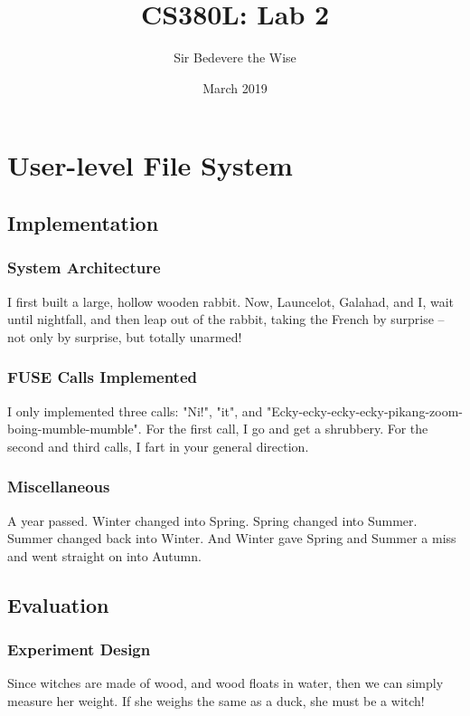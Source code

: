 \documentclass{article}
\title{CS380L: Lab 2}
\author{Sir Bedevere the Wise}
\date{March 2019}
\begin{document}
\maketitle

\section{User-level File System}
\subsection{Implementation}
\subsubsection{System Architecture}
I first built a large, hollow wooden rabbit. Now, Launcelot, Galahad, and I, wait until nightfall, and then leap out of the rabbit, taking the French by surprise -- not only by surprise, but totally unarmed!
\subsubsection{FUSE Calls Implemented}
I only implemented three calls: "Ni!", "it", and "Ecky-ecky-ecky-ecky-pikang-zoom-boing-mumble-mumble".
For the first call, I go and get a shrubbery. For the second and third calls, I fart in your general direction.
\subsubsection{Miscellaneous}
A year passed. Winter changed into Spring. Spring changed into Summer. Summer changed back into Winter. And Winter gave Spring and Summer a miss and went straight on into Autumn.
\subsection{Evaluation}
\subsubsection{Experiment Design}
Since witches are made of wood, and wood floats in water, then we can simply measure her weight. If she weighs the same as a duck, she must be a witch! 
\end{document}
